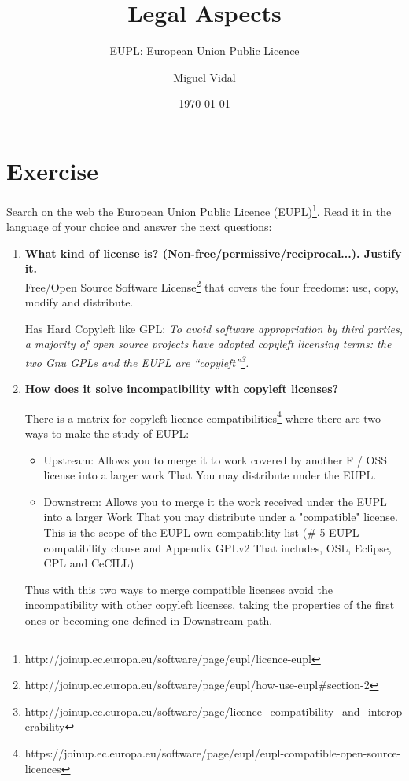 \documentclass[11pt]{scrartcl}
\title{\textbf{Legal Aspects}}
\subtitle{EUPL: European Union Public Licence}
\author{Miguel Vidal}
\date{\today}
\begin{document}
\maketitle

\section{Exercise}

Search on the web the European Union Public Licence (EUPL)\footnote{http://joinup.ec.europa.eu/software/page/eupl/licence-eupl}. Read it in the language of your choice and answer the next questions:
\begin{enumerate}

	\item \textbf{What kind of license is? (Non-free/permissive/reciprocal...). Justify it.}\\
	
	Free/Open Source Software License\footnote{http://joinup.ec.europa.eu/software/page/eupl/how-use-eupl\#section-2} that covers the four freedoms: use, copy, modify and distribute.
	
	Has Hard Copyleft like GPL: \emph{To avoid software appropriation by third parties, a majority of open source projects have adopted copyleft licensing terms: the two Gnu GPLs and the EUPL are “copyleft”\footnote{http://joinup.ec.europa.eu/software/page/licence\_compatibility\_and\_interoperability}.}
	\item \textbf{How does it solve incompatibility with copyleft licenses?}
	
	There is a matrix for copyleft licence compatibilities\footnote{https://joinup.ec.europa.eu/software/page/eupl/eupl-compatible-open-source-licences} where there are two ways to make the study of EUPL:

	\begin{itemize}
		\item Upstream: Allows you to merge it to work covered by another F / OSS license into a larger work That You may distribute under the EUPL.

		\item Downstrem: Allows you to merge it the work received under the EUPL into a larger Work That you may distribute under a "compatible" license. This is the scope of the EUPL own compatibility list (\# 5 EUPL compatibility clause and Appendix GPLv2 That includes, OSL, Eclipse, CPL and CeCILL)
	\end{itemize}
	
	Thus with this two ways to merge compatible licenses avoid the incompatibility with other copyleft licenses, taking the properties of the first ones or becoming one defined in Downstream path.
	

\end{enumerate}
\end{document}
